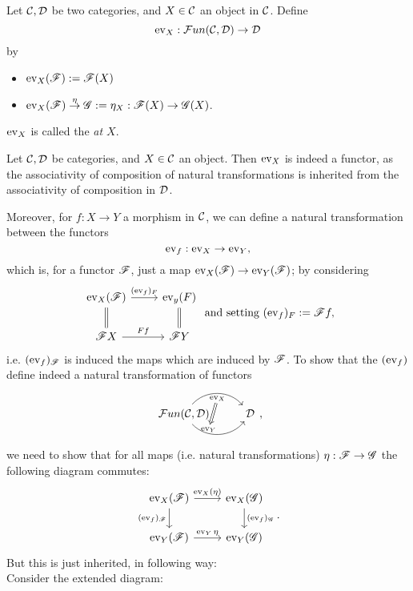 \begin{defn}
  Let $\mathcal{C},\mathcal{D}$ be two categories, and $X\in \mathcal{C}$ an object in $\mathcal{C}$. Define
  \[
  \operatorname{ev}_X:\mathcal{F}un(\mathcal{C},\mathcal{D})\to \mathcal{D}\]
  by
  \begin{itemize}
    \item $\operatorname{ev}_X(\mathscr{F}):= \mathscr{F}(X)$
    \item $\operatorname{ev}_X(\mathscr{F})\overset{\eta}{\to}\mathscr{G}:= \eta_X:\mathscr{F}(X)\to\mathscr{G}(X)$.
  \end{itemize}
  $\operatorname{ev}_X$ is called the  \emph{at $X$}.
\end{defn}

\begin{rem}
  Let $\mathcal{C},\mathcal{D}$ be categories, and $X\in \mathcal{C}$ an object. Then $\operatorname{ev}_X$ is indeed a functor, \coms as the associativity of composition of natural transformations is inherited from the associativity of composition in $\mathcal{D}$.\come\par
  Moreover, for $f:X\to Y$ a morphism in $\mathcal{C}$, we can define a natural transformation between the functors
  \[
  \operatorname{ev}_f:\operatorname{ev}_X\to \operatorname{ev}_Y,
  \]
  \coms which is, for a functor $\mathscr{F}$, just a map $\operatorname{ev}_X(\mathscr{F})\to \operatorname{ev}_Y(\mathscr{F})$\come; by considering
  \[
  \begin{tikzcd}\ev_X(\ffunc)\ar{r}{(\ev_f)_F}&\ev_y(F)\\
                          \ffunc X \ar[equal]{u}\ar{r}{Ff}&\ffunc Y \ar[equal]{u}
                        \end{tikzcd}~\text{and setting}~(\ev_f)_F:= \ffunc f,
        \]
  \coms i.e. $(\operatorname{ev}_f)_{\mathscr{F}}$ is induced the maps which are induced by $\mathscr{F}$.
  To show that the $(\operatorname{ev}_f)$ define indeed a natural transformation of functors
  \[\begin{tikzcd}
  \fnc(\ccat,\dcat) \arrow[r, bend left=50, "\ev_X"{name=U, below}]
  \arrow[r, bend right=50, "\ev_Y"{name=D}]
  &\dcat
  \arrow[Rightarrow, from=U, to=D] \end{tikzcd},
  \]
  we need to show that for all maps (i.e. natural transformations) $\eta: \mathscr{F} \to \mathscr{G}$ the following diagram commutes:
  \[
  \begin{tikzcd}
    \ev_X(\ffunc)\ar{r}{\ev_X(\eta)}\ar[swap]{d}{(\ev_f)_{\ffunc}}& \ev_X(\gfunc)\ar{d}{(\ev_f)_{\gfunc}}\\
    \ev_Y(\ffunc)\ar{r}{\ev_Y{\eta}}& \ev_Y(\gfunc)
  \end{tikzcd}.
  \]
  But this is just inherited, in following way:\come \\
  Consider the extended diagram:
  \[
  \begin{tikzcd}

\end{tikzcd}\]
\end{rem}
